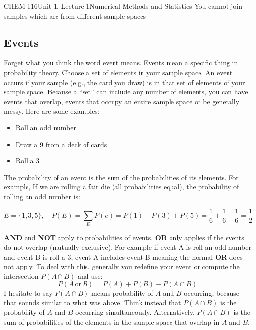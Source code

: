 \documentclass{article}
\begin{document}
\begin{tdoc}{CHEM 116}{Unit 1, Lecture 1}{Numerical Methods and Statistics}
You cannot join samples which are from different sample spaces

\subsection{Events}

Forget what you think the word event means. Events mean a specific
thing in probability theory. Choose a set of elements in your sample
space. An event occurs if your sample (e.g., the card you draw) is in
that set of elements of your sample space. Because a ``set'' can
include any number of elements, you can have events that overlap,
events that occupy an entire sample space or be generally messy. Here
are some examples:

\begin{itemize}

\item Roll an odd number
\item Draw a 9 from a deck of cards
\item Roll a 3

\end{itemize}

The probability of an event is the sum of the probabilities of its elements. For example,
If we are rolling a fair die (all probabilities equal), the probability of rolling an odd number is:


\begin{equation}
  E = \{1, 3, 5\}, \quad P(E) = \sum_E P(e) = P(1) + P(3) + P(5) = \frac{1}{6}  + \frac{1}{6} + \frac{1}{6} = \frac{1}{2}
\end{equation}
\vspace{0.5cm}

{\bf AND} and {\bf NOT} apply to probabilities of events. {\bf OR}
only applies if the events do not overlap (mutually exclusive). For
example if event A is roll an odd number and event B is roll a 3,
event A includes event B meaning the normal {\bf OR} does not
apply. To deal with this, generally you redefine your event or
compute the intersection $P(A\cap B)$ and use:
\begin{equation}
P(A\,\textrm{or}\,B) = P(A) + P(B) - P(A \cap B)
\end{equation}
I hesitate to say $P(A \cap B)$ means probability of $A$ and $B$
occurring, because that sounds similar to what was above. Think
instead that $P(A \cap B)$ is the probability of $A$ and $B$ occurring
simultaneously. Alternatively, $P(A \cap B)$ is the sum of
probabilities of the elements in the sample space that overlap in $A$
and $B$.


\end{tdoc}
\end{document}
